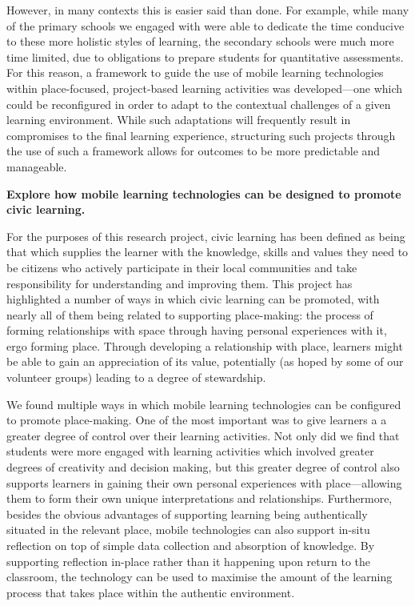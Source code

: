 However, in many contexts this is easier said than done. For example, while many of the primary schools we engaged with were able to dedicate the time conducive to these more holistic styles of learning, the secondary schools were much more time limited, due to obligations to prepare students for quantitative assessments. For this reason, a framework to guide the use of mobile learning technologies within place-focused, project-based learning activities was developed---one which could be reconfigured in order to adapt to the contextual challenges of a given learning environment. While such adaptations will frequently result in compromises to the final learning experience, structuring such projects through the use of such a framework allows for outcomes to be more predictable and manageable. 

\begin{displayquote}
\textbf{Explore how mobile learning technologies can be designed to promote civic learning.}
\end{displayquote}

For the purposes of this research project, civic learning has been defined as being that which supplies the learner with the knowledge, skills and values they need to be citizens who actively participate in their local communities and take responsibility for understanding and improving them. This project has highlighted a number of ways in which civic learning can be promoted, with nearly all of them being related to supporting place-making: the process of forming relationships with space through having personal experiences with it, ergo forming place. Through developing a relationship with place, learners might be able to gain an appreciation of its value, potentially (as hoped by some of our volunteer groups) leading to a degree of stewardship.

We found multiple ways in which mobile learning technologies can be configured to promote place-making. One of the most important was to give learners a a greater degree of control over their learning activities. Not only did we find that students were more engaged with learning activities which involved greater degrees of creativity and decision making, but this greater degree of control also supports learners in gaining their own personal experiences with place---allowing them to form their own unique interpretations and relationships. Furthermore, besides the obvious advantages of supporting learning being authentically situated in the relevant place, mobile technologies can also support in-situ reflection on top of simple data collection and absorption of knowledge. By supporting reflection in-place rather than it happening upon return to the classroom, the technology can be used to maximise the amount of the learning process that takes place within the authentic environment.

